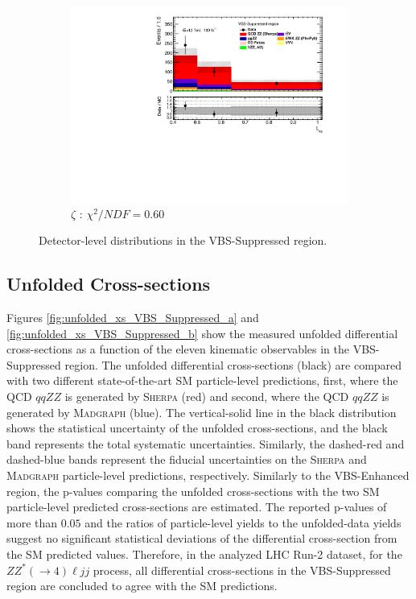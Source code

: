\begin{figure}[!htb]
\begin{subfigure}{.49\textwidth}
        \includegraphics[width=.98\linewidth]{figures/Results/RecoDist_VBSSuppressed/reco_centrality_CR.pdf}
        \caption{ \footnotesize{$\zeta$ }: $\chi^2/NDF = 0.60$ }
    \end{subfigure}
    \caption{Detector-level distributions in the VBS-Suppressed region.}  \label{fig:reco_VBS_Suppressed_b}
\end{figure}

\subsection{Unfolded Cross-sections}
\label{appendix:VBSSupUnfolded}

Figures \ref{fig:unfolded_xs_VBS_Suppressed_a} and \ref{fig:unfolded_xs_VBS_Suppressed_b} show the measured unfolded differential cross-sections as a function of the eleven kinematic observables in the VBS-Suppressed region. The unfolded differential cross-sections (black) are compared with two different state-of-the-art SM particle-level predictions, first, where the QCD $qqZZ$ is generated by \textsc{Sherpa} (red) and second, where the QCD $qqZZ$ is generated by \textsc{Madgraph} (blue). The vertical-solid line in the black distribution shows the statistical uncertainty of the unfolded cross-sections, and the black band represents the total systematic uncertainties. Similarly, the dashed-red and dashed-blue bands represent the fiducial uncertainties on the \textsc{Sherpa} and \textsc{Madgraph} particle-level predictions, respectively. Similarly to the VBS-Enhanced region, the p-values comparing the unfolded cross-sections with the two SM particle-level predicted cross-sections are estimated. The reported p-values of more than $0.05$ and the ratios of particle-level yields to the unfolded-data yields suggest no significant statistical deviations of the differential cross-section from the SM predicted values. Therefore, in the analyzed LHC Run-2 dataset, for the $ZZ^*(\rightarrow 4) \ell jj$ process, all differential cross-sections in the VBS-Suppressed region are concluded to agree with the SM predictions. 

